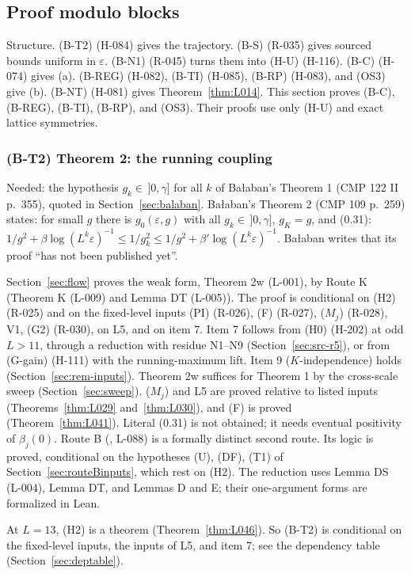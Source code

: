 \subsection{Proof modulo blocks}\label{sec:blocks}
Structure. (B-T2) (H-084) gives the trajectory. (B-S) (R-035) gives sourced bounds uniform in $\varepsilon$. (B-N1) (R-045) turns them into (H-U) (H-116). (B-C) (H-074) gives (a). (B-REG) (H-082), (B-TI) (H-085), (B-RP) (H-083), and (OS3) give (b). (B-NT) (H-081) gives Theorem~\ref{thm:L014}. This section proves (B-C), (B-REG), (B-TI), (B-RP), and (OS3). Their proofs use only (H-U) and exact lattice symmetries.

\subsubsection{(B-T2) Theorem 2: the running coupling}\label{sec:BT2}
Needed: the hypothesis $g_k\in\,]0,\gamma]$ for all $k$ of Ba{\l}aban's Theorem 1 (CMP 122 II p.\ 355), quoted in Section~\ref{sec:balaban}. Ba{\l}aban's Theorem 2 (CMP 109 p.\ 259) \cite{balaban109} states: for small $g$ there is $g_0(\varepsilon,g)$ with all $g_k\in\,]0,\gamma]$, $g_K=g$, and (0.31): $1/g^2+\beta\log(L^k\varepsilon)^{-1}\le1/g_k^2\le1/g^2+\beta'\log(L^k\varepsilon)^{-1}$. Ba{\l}aban writes that its proof ``has not been published yet''.

Section~\ref{sec:flow} proves the weak form, Theorem 2w (L-001), by Route K (Theorem K (L-009) and Lemma DT (L-005)). The proof is conditional on (H2) (R-025) and on the fixed-level inputs (PI) (R-026), (F) (R-027), ($M_j$) (R-028), V1, (G2) (R-030), on L5, and on item 7. Item 7 follows from (H0) (H-202) at odd $L>11$, through a reduction with residue N1--N9 (Section~\ref{sec:src-r5}), or from (G-gain) (H-111) with the running-maximum lift. Item 9 ($K$-independence) holds (Section~\ref{sec:rem-inputs}). Theorem 2w suffices for Theorem 1 by the cross-scale sweep (Section~\ref{sec:sweep}). ($M_j$) and L5 are proved relative to listed inputs (Theorems~\ref{thm:L029} and~\ref{thm:L030}), and (F) is proved (Theorem~\ref{thm:L041}). Literal (0.31) is not obtained; it needs eventual positivity of $\beta_j(0)$. Route B (\ThmPW, L-088) is a formally distinct second route. Its logic is proved, conditional on the hypotheses (U), (DF), (T1) of Section~\ref{sec:routeBinputs}, which rest on (H2). The reduction uses Lemma DS (L-004), Lemma DT, and Lemmas D and E; their one-argument forms are formalized in Lean.

At $L=13$, (H2) is a theorem (Theorem~\ref{thm:L046}). So (B-T2) is conditional on the fixed-level inputs, the inputs of L5, and item 7; see the dependency table (Section~\ref{sec:deptable}).


